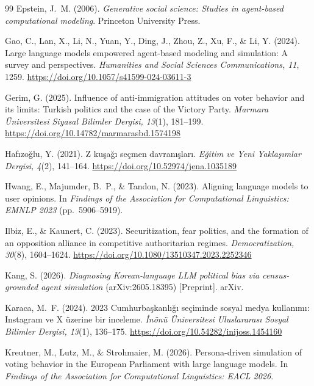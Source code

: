 \documentclass[12pt,a4paper]{report}
\begin{document}
\begin{thebibliography}{99}
Epstein, J.~M. (2006). \emph{Generative social science: Studies in agent-based computational modeling}. Princeton University Press.

Gao, C., Lan, X., Li, N., Yuan, Y., Ding, J., Zhou, Z., Xu, F., \& Li, Y. (2024). Large language models empowered agent-based modeling and simulation: A survey and perspectives. \emph{Humanities and Social Sciences Communications, 11}, 1259. \url{https://doi.org/10.1057/s41599-024-03611-3}

Gerim, G. (2025). Influence of anti-immigration attitudes on voter behavior and its limits: Turkish politics and the case of the Victory Party. \emph{Marmara Üniversitesi Siyasal Bilimler Dergisi, 13}(1), 181--199. \url{https://doi.org/10.14782/marmarasbd.1574198}

Hafızoğlu, Y. (2021). Z kuşağı seçmen davranışları. \emph{Eğitim ve Yeni Yaklaşımlar Dergisi, 4}(2), 141--164. \url{https://doi.org/10.52974/jena.1035189}

Hwang, E., Majumder, B.~P., \& Tandon, N. (2023). Aligning language models to user opinions. In \emph{Findings of the Association for Computational Linguistics: EMNLP 2023} (pp.~5906--5919).

Ilbiz, E., \& Kaunert, C. (2023). Securitization, fear politics, and the formation of an opposition alliance in competitive authoritarian regimes. \emph{Democratization, 30}(8), 1604--1624. \url{https://doi.org/10.1080/13510347.2023.2252346}

Kang, S. (2026). \emph{Diagnosing Korean-language LLM political bias via census-grounded agent simulation} (arXiv:2605.18395) [Preprint]. arXiv.

Karaca, M.~F. (2024). 2023 Cumhurbaşkanlığı seçiminde sosyal medya kullanımı: Instagram ve X üzerine bir inceleme. \emph{İnönü Üniversitesi Uluslararası Sosyal Bilimler Dergisi, 13}(1), 136--175. \url{https://doi.org/10.54282/inijoss.1454160}

Kreutner, M., Lutz, M., \& Strohmaier, M. (2026). Persona-driven simulation of voting behavior in the European Parliament with large language models. In \emph{Findings of the Association for Computational Linguistics: EACL 2026}.


\end{thebibliography}
\end{document}
